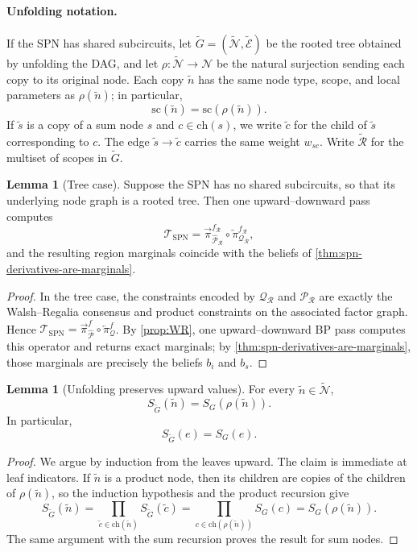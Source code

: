 \documentclass[12pt]{article}
\newcommand{\1}{\mathbb{1}}
\theoremstyle{definition}
\newtheorem{lemma}[theorem]{Lemma}
\newcommand{\Iproj}{\overleftarrow{\pi}}     %
\newcommand{\Rproj}{\overrightarrow{\pi}}    %
\begin{document}
\paragraph{Unfolding notation.}
If the SPN has shared subcircuits, let $\widetilde G=(\widetilde{\mathcal N},\widetilde{\mathcal E})$ be the rooted tree obtained by unfolding the DAG, and let $\rho:\widetilde{\mathcal N}\to\mathcal N$ be the natural surjection sending each copy to its original node. Each copy $\tilde n$ has the same node type, scope, and local parameters as $\rho(\tilde n)$; in particular,
\[
\mathrm{sc}(\tilde n)=\mathrm{sc}(\rho(\tilde n)).
\]
If $\tilde s$ is a copy of a sum node $s$ and $c\in\mathrm{ch}(s)$, we write $\tilde c$ for the child of $\tilde s$ corresponding to $c$. The edge $\tilde s\to\tilde c$ carries the same weight $w_{sc}$. Write $\widetilde{\mathcal R}$ for the multiset of scopes in $\widetilde G$.

\begin{lemma}[Tree case]
\label{lem:spn-tree-case}
Suppose the SPN has no shared subcircuits, so that its underlying node graph is a rooted tree. Then one upward--downward pass computes
\[
\mathcal T_{\mathrm{SPN}}
=
\Rproj^{f_{\mathcal R}}_{\widehat{\mathcal P}_{\mathcal R}}
\circ
\Iproj^{f_{\mathcal R}}_{\mathcal Q_{\mathcal R}},
\]
and the resulting region marginals coincide with the beliefs of
\cref{thm:spn-derivatives-are-marginals}.
\end{lemma}

\begin{proof}
In the tree case, the constraints encoded by $\mathcal Q_{\mathcal R}$ and $\mathcal P_{\mathcal R}$ are exactly the Walsh--Regalia consensus and product constraints on the associated factor graph. Hence $\mathcal T_{\mathrm{SPN}}
=
\Rproj^f_{\widehat{\mathcal P}}\circ\Iproj^f_{\mathcal Q}$. By \cref{prop:WR}, one upward--downward BP pass computes this operator and returns exact marginals; by \cref{thm:spn-derivatives-are-marginals}, those marginals are precisely the beliefs $b_i$ and $b_s$.
\end{proof}

\begin{lemma}[Unfolding preserves upward values]
\label{lem:spn-unfolding-upward}
For every $\tilde n\in\widetilde{\mathcal N}$,
\[
S_{\widetilde G}(\tilde n)=S_G(\rho(\tilde n)).
\]
In particular,
\[
S_{\widetilde G}(e)=S_G(e).
\]
\end{lemma}

\begin{proof}
We argue by induction from the leaves upward. The claim is immediate at leaf indicators. If $\tilde n$ is a product node, then its children are copies of the children of $\rho(\tilde n)$, so the induction hypothesis and the product recursion give
\[
S_{\widetilde G}(\tilde n)
=
\prod_{\tilde c\in\mathrm{ch}(\tilde n)} S_{\widetilde G}(\tilde c)
=
\prod_{c\in\mathrm{ch}(\rho(\tilde n))} S_G(c)
=
S_G(\rho(\tilde n)).
\]
The same argument with the sum recursion proves the result for sum nodes.
\end{proof}
\end{document}
